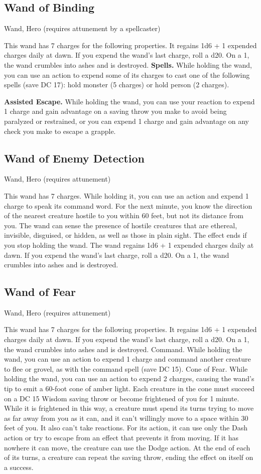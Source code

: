 \subsection{Wand of Binding}
Wand, Hero (requires attunement by a spellcaster) 

This wand has 7 charges for the following properties. It regains 1d6 + 1 expended charges daily at dawn. If you expend the wand's last charge, roll a d20. On a 1, the wand crumbles into ashes and is destroyed.
\textbf{Spells.} While holding the wand, you can use an action to expend some of its charges to cast one of the following spells (save DC 17): hold monster (5 charges) or hold person (2 charges).

\textbf{Assisted Escape.} While holding the wand, you can use your reaction to expend 1 charge and gain advantage on a saving throw you make to avoid being paralyzed or restrained, or you can expend 1 charge and gain advantage on any check you make to escape a grapple.

\subsection{Wand of Enemy Detection}
Wand, Hero (requires attunement)

This wand has 7 charges. While holding it, you can use an action and expend 1 charge to speak its command word. For the next minute, you know the direction of the nearest creature hostile to you within 60 feet,
but not its distance from you. The wand can sense the presence of hostile creatures that are ethereal, invisible, disguised, or hidden, as well as those in plain sight. The effect ends if you stop holding the wand.
The wand regains 1d6 + 1 expended charges daily at dawn. If you expend the wand's last charge, roll a d20. On a 1, the wand crumbles into ashes and is destroyed.

\subsection{Wand of Fear}
Wand, Hero (requires attunement)

This wand has 7 charges for the following properties. It regains 1d6 + 1 expended charges daily at dawn. If you expend the wand's last charge, roll a d20. On a 1, the wand crumbles into ashes and is destroyed.
Command. While holding the wand, you can use an action to expend 1 charge and command another creature to flee or grovel, as with the command spell (save DC 15).
Cone of Fear. While holding the wand, you can use an action to expend 2 charges, causing the wand's tip to emit a 60-foot cone of amber light. Each creature in the cone must succeed on a DC 15 Wisdom saving throw or become frightened of you for 1 minute. While it is frightened in this way, a creature must spend its turns trying to move as far away from you as it can, and it can't willingly move to a space within 30 feet of you. It also can't take reactions. For its action, it can use only the Dash action or try to escape from an effect that prevents it from moving. If it has nowhere it can move, the creature can use the Dodge action. At the end of each of its turns, a creature can repeat the saving throw, ending the effect on itself on a success.

